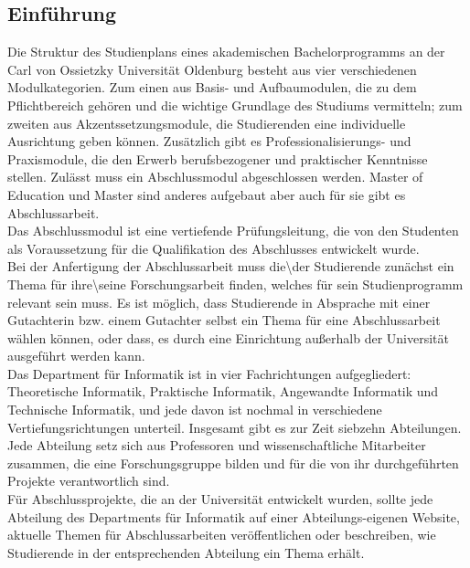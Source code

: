\subsection{Einführung}
Die Struktur des Studienplans eines akademischen Bachelorprogramms an der Carl von Ossietzky Universität Oldenburg besteht aus vier verschiedenen Modulkategorien. Zum einen aus Basis- und Aufbaumodulen, die zu dem Pflichtbereich gehören und die wichtige Grundlage des Studiums vermitteln; zum zweiten aus Akzentssetzungsmodule, die Studierenden eine individuelle Ausrichtung geben können. Zusätzlich gibt es Professionalisierungs- und Praxismodule, die den Erwerb berufsbezogener und praktischer Kenntnisse stellen. Zulässt muss ein Abschlussmodul abgeschlossen werden. Master of Education und Master sind anderes aufgebaut aber auch für sie gibt es Abschlussarbeit.\\
Das Abschlussmodul ist eine vertiefende Prüfungsleitung, die von den Studenten als Voraussetzung für die Qualifikation des Abschlusses entwickelt wurde\cite{BScInf:2020}.\\

Bei der Anfertigung der Abschlussarbeit muss die\textbackslash der Studierende zunächst ein Thema für ihre\textbackslash seine Forschungsarbeit finden, welches für sein Studienprogramm relevant sein muss. Es ist möglich, dass Studierende in Absprache mit einer Gutachterin bzw. einem Gutachter selbst ein Thema für eine Abschlussarbeit wählen können, oder dass, es durch eine Einrichtung au{\ss}erhalb der Universität ausgeführt werden kann\cite{Boles:2015}.\\

Das Department für Informatik ist in vier Fachrichtungen aufgegliedert: Theoretische Informatik, Praktische Informatik, Angewandte Informatik und Technische Informatik, und jede davon ist nochmal in verschiedene Vertiefungsrichtungen unterteil. Insgesamt gibt es zur Zeit siebzehn Abteilungen\cite{SpeInf:2020}. Jede Abteilung setz sich aus Professoren und wissenschaftliche Mitarbeiter zusammen, die eine Forschungsgruppe bilden und für die von ihr durchgeführten Projekte verantwortlich sind.\\
Für Abschlussprojekte, die an der Universität entwickelt wurden, sollte jede Abteilung des Departments für Informatik auf einer Abteilungs-eigenen Website, aktuelle Themen für Abschlussarbeiten veröffentlichen oder beschreiben, wie Studierende in der entsprechenden Abteilung ein Thema erhält\cite{Boles:2015}.\\

